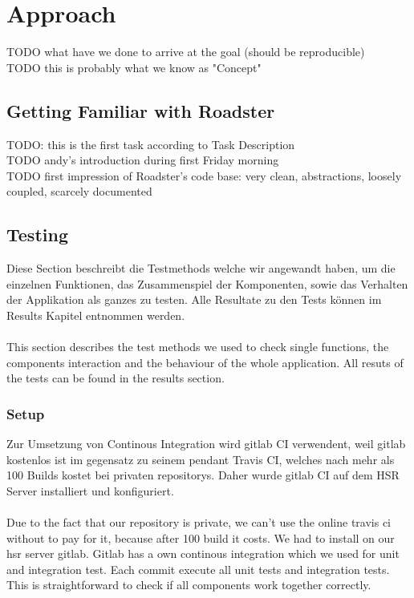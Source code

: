 \chapter{Approach}
TODO what have we done to arrive at the goal (should be reproducible)\\
TODO this is probably what we know as "Concept"\\


\section{Getting Familiar with Roadster}
TODO: this is the first task according to Task Description\\
TODO andy's introduction during first Friday morning\\
TODO first impression of Roadster's code base: very clean, abstractions, loosely coupled, scarcely documented

\section{Testing}
Diese Section beschreibt die Testmethods welche wir angewandt haben, um die 
einzelnen Funktionen, das Zusammenspiel der Komponenten, sowie das Verhalten 
der Applikation als ganzes zu testen. Alle Resultate zu den Tests können im 
Results Kapitel entnommen werden.\\
\\
This section describes the test methods we used to check single functions, 
the components interaction and the behaviour of the whole application.
All resuts of the tests can be found in the results section.

\subsection{Setup}
Zur Umsetzung von Continous Integration wird gitlab CI verwendent, weil gitlab
kostenlos ist im gegensatz zu seinem pendant Travis CI, welches nach mehr als 100
Builds kostet bei privaten repositorys. 
Daher wurde gitlab CI auf dem HSR Server installiert und konfiguriert.\\
\\
Due to the fact that our repository is private, we can't use the online 
travis ci without to pay for it, because after 100 build it costs.
We had to install on our hsr server gitlab. Gitlab has a own continous integration 
which we used for unit and integration test. Each commit execute all unit tests and 
integration tests. This is straightforward to check if all components work together correctly.

